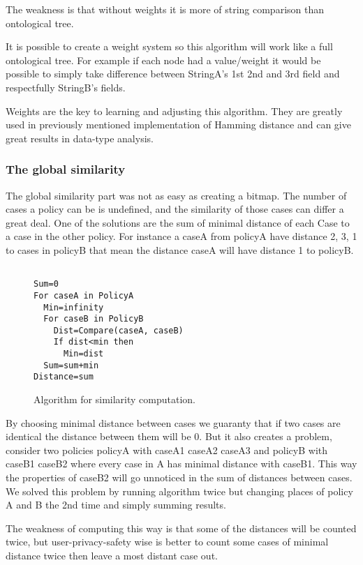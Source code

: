 The weakness is that without weights it is more of string comparison than ontological tree.

It is possible to create a weight system so this algorithm will work like a full ontological tree. For example if each node had a value/weight it would be possible to simply take difference between StringA’s 1st 2nd and 3rd field and respectfully StringB’s fields.
 
Weights are the key to learning and adjusting this algorithm. They are greatly used in previously mentioned implementation of Hamming distance and can give great results in data-type analysis.

\subsubsection{ The global similarity }
The global similarity part was not as easy as creating a bitmap. The number of cases a policy can be is undefined, and the similarity of those cases can differ a great deal. One of the solutions are the sum of minimal distance of each Case to a case in the other policy. For instance a caseA from policyA have distance 2, 3, 1 to cases in policyB that mean the distance caseA will have distance 1 to policyB. 

\begin{figure}[htpb]

\begin{verbatim}

Sum=0
For caseA in PolicyA
  Min=infinity
  For caseB in PolicyB
    Dist=Compare(caseA, caseB)
    If dist<min then
      Min=dist
  Sum=sum+min
Distance=sum
\end{verbatim}

  \caption{Algorithm for similarity computation.}
  \label{similAlgo}
\end{figure}
 

By choosing minimal distance between cases we guaranty that if two cases are identical the distance between them will be 0. But it also creates a problem, consider two policies policyA with {caseA1 caseA2 caseA3} and policyB with {caseB1 caseB2} where every case in A has minimal distance with caseB1. This way the properties of caseB2 will go unnoticed in the sum of distances between cases. We solved this problem by running algorithm twice but changing places of policy A and B the 2nd time and simply summing results.

The weakness of computing this way is that some of the distances will be counted twice, but user-privacy-safety wise is better to count some cases of minimal distance twice then leave a most distant case out.

